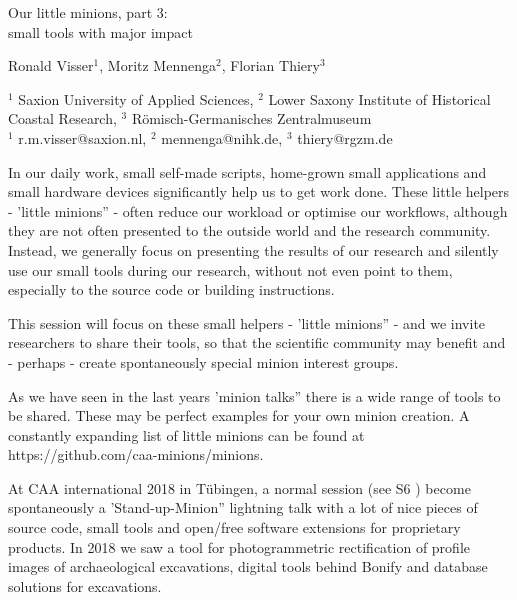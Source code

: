 \documentclass[a4paper]{article}
\begin{document}

\Large
 \begin{center}
Our little minions, part 3:\\ small tools with major impact\\ 

\hspace{10pt}

\large
Ronald Visser$^1$, Moritz Mennenga$^2$, Florian Thiery$^3$\\

\hspace{10pt}

\small  
$^1$ Saxion University of Applied Sciences, $^2$ Lower Saxony Institute of Historical Coastal Research, $^3$ R{\"o}misch-Germanisches Zentralmuseum\\
$^1$ r.m.visser@saxion.nl, $^2$ mennenga@nihk.de, $^3$ thiery@rgzm.de\\

\end{center}

\normalsize

In our daily work, small self-made scripts, home-grown small applications and small hardware devices significantly help us to get work done. These little helpers - 'little minions” - often reduce our workload or optimise our workflows, although they are not often presented to the outside world and the research community. Instead, we generally focus on presenting the results of our research and silently use our small tools during our research, without not even point to them, especially to the source code or building instructions.

This session will focus on these small helpers  - 'little minions” - and we invite researchers to share their tools, so that the scientific community may benefit and - perhaps - create spontaneously special minion interest groups.

As we have seen in the last years 'minion talks” there is a wide range of tools to be shared. These may be perfect examples for your own minion creation. A constantly expanding list of little minions can be found at https://github.com/caa-minions/minions.

At CAA international 2018 in Tübingen, a normal session (see S6 \cite{boa_caa_2018}) become spontaneously a 'Stand-up-Minion” lightning talk with a lot of nice pieces of source code, small tools and open/free software extensions for proprietary products. In 2018 we saw a tool for photogrammetric rectification of profile images of archaeological excavations, digital tools behind Bonify and database solutions for excavations.
\end{document}
